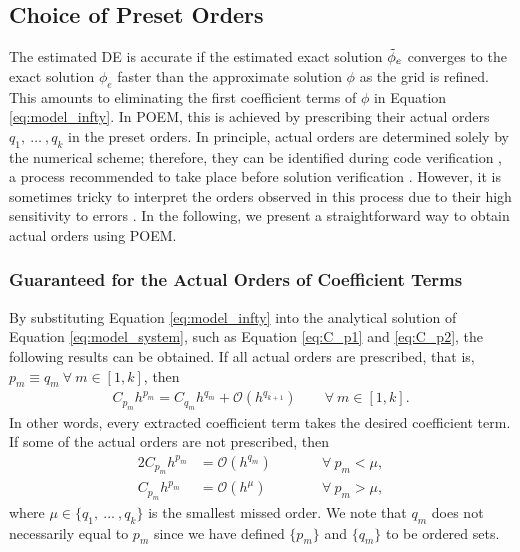 \subsection{Choice of Preset Orders} \label{subsec:choice_orders}
The estimated DE is accurate if the estimated exact solution $\Tilde{\phi}_e$ converges to the exact solution $\phi_e$ faster than the approximate solution $\phi$ as the grid is refined. This amounts to eliminating the first coefficient terms of $\phi$ in Equation \ref{eq:model_infty}. In POEM, this is achieved by prescribing their actual orders $q_1,\ \dots \ , q_k$ in the preset orders. In principle, actual orders are determined solely by the numerical scheme; therefore, they can be identified during code verification \citep{Knupp2002,Salari2000}, a process recommended to take place before solution verification \citep{Roy2005}. However, it is sometimes tricky to interpret the orders observed in this process due to their high sensitivity to errors \citep{Love2013}. In the following, we present a straightforward way to obtain actual orders using POEM.


\subsubsection{Guaranteed for the Actual Orders of Coefficient Terms} \label{subsubsec:guarantee}
By substituting Equation \ref{eq:model_infty} into the analytical solution of Equation \ref{eq:model_system}, such as Equation \ref{eq:C_p1} and \ref{eq:C_p2}, the following results can be obtained. If all actual orders are prescribed, that is, $p_m \equiv q_m \ \forall \ m \in [1,k]$, then
\begin{align} \label{eq:correctPreset}
    C_{p_m} h^{p_m} = C_{q_m} h^{q_m} + \mathcal{O}(h^{q_{k+1}}) \hspace{2em} \forall \ m \in [1,k].
\end{align}
In other words, every extracted coefficient term takes the desired coefficient term. If some of the actual orders are not prescribed, then
\begin{alignat}{2}
    C_{p_m} h^{p_m} &= \mathcal{O}(h^{q_m}) &&\hspace{2em} \forall \ p_m < \mu, \label{eq:wrongPreset_small} \\ 
    C_{p_m} h^{p_m} &= \mathcal{O}(h^{\mu}) &&\hspace{2em} \forall \ p_m > \mu, \label{eq:wrongPreset_large}
\end{alignat}
where $\mu \in \{q_1,\ \dots \ , q_k\}$ is the smallest missed order. We note that $q_m$ does not necessarily equal to $p_m$ since we have defined $\{p_m\}$ and $\{q_m\}$ to be ordered sets.

